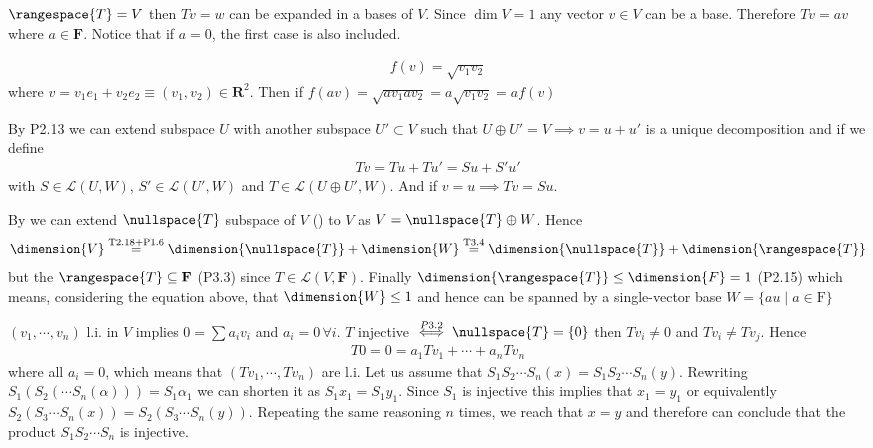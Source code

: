 $\rangespace{T}=V$ then $Tv = w$ can be expanded in a bases of $V$. Since $\dim{V}=1$ any vector $v\in V$ can be a base. Therefore $Tv = a v$ where $a\in \mathbf{F}$. Notice that if $a=0$, the first case is also included.

\exo{}
\begin{align*}
  f(v) = \sqrt{v_1 v_2}
\end{align*} 
where $v=v_1e_1+v_2e_2 \equiv (v_1,v_2) \in \mathbf{R}^2$. Then if $f(av) = \sqrt{av_1 av_2} = a\sqrt{v_1v_2} = af(v)$


\exo{} By  P2.13 we can extend subspace $U$ with another subspace $U'\subset V$ such that $U\oplus U' = V \implies v = u+u'$ 
is a unique decomposition and if we define 
\begin{align*}
Tv = Tu+Tu' = Su + S'u'
\end{align*}  
with $S\in\mathcal{L}(U,W)$, $S'\in\mathcal{L}(U',W)$ and $T\in\mathcal{L}(U\oplus U',W)$. 
And if $v=u \implies Tv = Su$.

\exo{} By  we can extend $\nullspace{T}$ subspace of $V$ () to $V$ as $V = \nullspace{T} \oplus W$. Hence
\begin{align*}
\dimension{V} \stackrel{\text{T2.18}+\text{P1.6}}{=} \dimension{\nullspace{T}} + \dimension{W} \stackrel{\text{T3.4}}{=} \dimension{\nullspace{T}} + \dimension{\rangespace{T}}
\end{align*} 
but the $\rangespace{T}\subseteq \mathbf{F}$ (P3.3) since $T\in\mathcal{L}(V,\mathbf{F})$. Finally $\dimension{\rangespace{T}}\leq\dimension{F}=1$ (P2.15) which means, considering the equation above, that $\dimension{W}\leq 1$ and hence can be spanned by a single-vector base $W=\{au \mid a\in\mathrm{F}\}$

\exo{} $(v_1,\cdots,v_n)$ l.i. in $V$ implies $0=\sum a_iv_i$ and $a_i=0\,\forall i$. $T$ injective $\stackrel{P3.2}{\iff} \nullspace{T}=\{0\}$ then $Tv_i\neq 0$ and $Tv_i\neq Tv_j$. Hence 
\begin{align*}
T0 = 0 = a_1 Tv_1 + \cdots + a_n Tv_n
\end{align*}
where all $a_i=0$, which means that $(Tv_1,\cdots,Tv_n)$ are l.i. 
\exo{} Let us assume that $S_1S_2\cdots S_n(x) = S_1S_2\cdots S_n(y)$. 
Rewriting $S_1(S_2( \cdots S_n(\alpha) )) = S_1 \alpha_1$ we can shorten it as $S_1 x_1 = S_1 y_1$. 
Since $S_1$ is injective this implies that $x_1 = y_1$ or equivalently $S_2( S_3 \cdots S_n(x)) = S_2( S_3 \cdots S_n(y))$. 
Repeating the same reasoning $n$ times, we reach that $x=y$ and therefore can conclude that the product 
$S_1S_2\cdots S_n$ is injective. 

